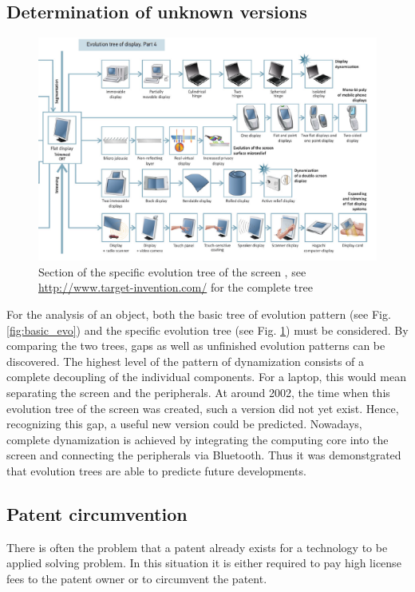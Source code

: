 \documentclass[11pt,a4paper]{article}
\begin{document}
\subsection{Determination of unknown versions}

\begin{figure}[htb]
  \centering
  \includegraphics[width=.9\linewidth]{figures/removabledisplay.png}
  \caption{\small Section of the specific evolution tree of the screen
    \cite{Shpakovsky2016}, see \url{http://www.target-invention.com/} for the
    complete tree}
	\label{fig:spec_evo}
\end{figure}

For the analysis of an object, both the basic tree of evolution pattern (see
Fig. \ref{fig:basic_evo}) and the specific evolution tree (see
Fig. \ref{fig:spec_evo}) must be considered.  By comparing the two trees, gaps
as well as unfinished evolution patterns can be discovered. The highest level
of the pattern of dynamization consists of a complete decoupling of the
individual components. For a laptop, this would mean separating the screen and
the peripherals. At around 2002, the time when this evolution tree of the
screen was created, such a version did not yet exist. Hence, recognizing this
gap, a useful new version could be predicted. Nowadays, complete dynamization
is achieved by integrating the computing core into the screen and connecting
the peripherals via Bluetooth. Thus it was demonstgrated that evolution trees
are able to predicte future developments.

\subsection{Patent circumvention}

There is often the problem that a patent already exists for a technology to be
applied solving problem.  In this situation it is either required to pay high
license fees to the patent owner or to circumvent the patent.
\end{document}
